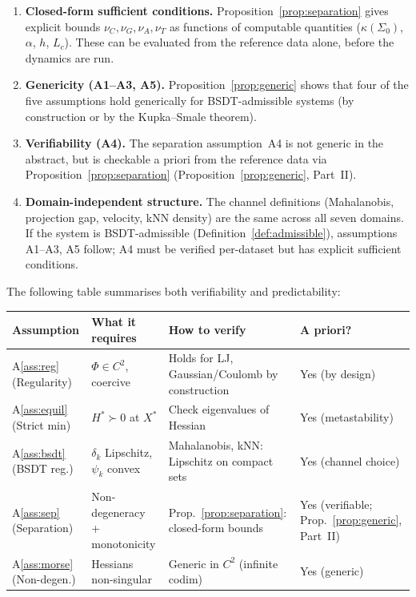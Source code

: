 \documentclass[11pt,a4paper]{article}
\begin{document}
\begin{enumerate}[nosep]
  \item \textbf{Closed-form sufficient conditions.}
    Proposition~\ref{prop:separation} gives explicit bounds
    $\nu_C, \nu_G, \nu_A, \nu_T$ as functions of computable
    quantities ($\kappa(\Sigma_0)$, $\alpha$, $h$, $L_c$).
    These can be evaluated from the reference data alone,
    before the dynamics are run.
  \item \textbf{Genericity (A1--A3, A5).}
    Proposition~\ref{prop:generic} shows that four of the five
    assumptions hold generically for BSDT-admissible systems
    (by construction or by the Kupka--Smale theorem).
  \item \textbf{Verifiability (A4).}
    The separation assumption~A4 is not generic in the abstract,
    but is checkable a priori from the reference data via
    Proposition~\ref{prop:separation}
    (Proposition~\ref{prop:generic}, Part~II).
  \item \textbf{Domain-independent structure.}  The channel
    definitions (Mahalanobis, projection gap, velocity, kNN
    density) are the same across all seven domains.  If the
    system is BSDT-admissible
    (Definition~\ref{def:admissible}), assumptions A1--A3, A5 follow;
    A4 must be verified per-dataset but has explicit sufficient conditions.
\end{enumerate}

The following table summarises both verifiability and predictability:

\begin{center}\small
\begin{tabular}{@{}p{2.4cm}p{2.8cm}p{3.0cm}p{2.5cm}@{}}
\toprule
\textbf{Assumption} & \textbf{What it requires} &
  \textbf{How to verify} & \textbf{A priori?} \\
\midrule
A\ref{ass:reg} (Regularity) &
  $\Phi \in C^2$, coercive &
  Holds for LJ, Gaussian/Coulomb by construction &
  Yes (by design) \\
A\ref{ass:equil} (Strict min) &
  $H^* \succ 0$ at $X^*$ &
  Check eigenvalues of Hessian &
  Yes (metastability) \\
A\ref{ass:bsdt} (BSDT reg.) &
  $\delta_k$ Lipschitz, $\psi_k$ convex &
  Mahalanobis, kNN: Lipschitz on compact sets &
  Yes (channel choice) \\
A\ref{ass:sep} (Separation) &
  Non-degeneracy + monotonicity &
  Prop.~\ref{prop:separation}: closed-form bounds &
  Yes (verifiable; Prop.~\ref{prop:generic}, Part~II) \\
A\ref{ass:morse} (Non-degen.) &
  Hessians non-singular &
  Generic in $C^2$ (infinite codim) &
  Yes (generic) \\
\bottomrule
\end{tabular}
\end{center}
\end{document}
